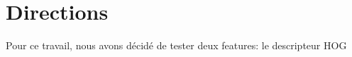 
\chapter{Directions}

Pour ce travail, nous avons décidé de tester deux features: le descripteur HOG 
\todo[inline]{}